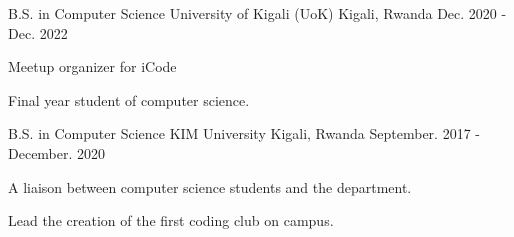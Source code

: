 \begin{cventries}
  \cventry
    {B.S. in Computer Science}
    {University of Kigali (UoK)}
    {Kigali, Rwanda}
    {Dec. 2020 - Dec. 2022}
    {
      \begin{cvitems}
        \item {Meetup organizer for iCode}
        \item {Final year student of computer science.}
      \end{cvitems}
    }
  \cventry
    {B.S. in Computer Science}
    {KIM University}
    {Kigali, Rwanda}
    {September. 2017 - December. 2020}
    {
      \begin{cvitems}
        \item {A liaison between computer science students and the department. }
        \item {Lead the creation of the first coding club on campus.}
      \end{cvitems}
    }
\end{cventries}
